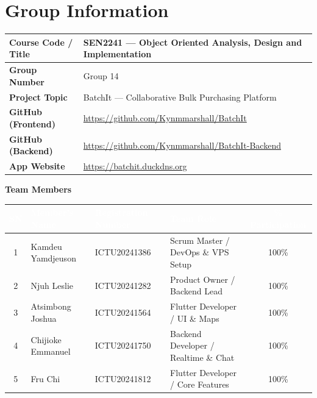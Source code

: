 \documentclass[12pt, a4paper]{report}
\begin{document}
\chapter*{Group Information}

\vspace{0.2cm}
\begin{tabularx}{\textwidth}{lX}
\toprule
\rowcolor{batchitLight}
\textbf{Course Code / Title} & SEN2241 --- Object Oriented Analysis, Design and Implementation\\
\midrule
\textbf{Group Number}        & Group 14 \\
\textbf{Project Topic}       & BatchIt --- Collaborative Bulk Purchasing Platform \\
\textbf{GitHub (Frontend)}   & \url{https://github.com/Kynmmarshall/BatchIt} \\
\textbf{GitHub (Backend)}    & \url{https://github.com/Kynmmarshall/BatchIt-Backend} \\
\textbf{App Website}         & \url{https://batchit.duckdns.org} \\
\bottomrule
\end{tabularx}

\vspace{0.8cm}
{\large\bfseries\color{batchitDark} Team Members}

\vspace{0.4cm}
\begin{tabularx}{\textwidth}{c X X X c}
\toprule
\rowcolor{tablehead}
\textcolor{white}{\textbf{SN}} &
\textcolor{white}{\textbf{Member's Name}} &
\textcolor{white}{\textbf{Registration Number}} &
\textcolor{white}{\textbf{Team Role}} &
\textcolor{white}{\textbf{\% Participation}}\\
\midrule
1 & Kamdeu Yamdjeuson    & ICTU20241386 & Scrum Master / DevOps \& VPS Setup & 100\% \\
\rowcolor{batchitLight}
2 & Njuh Leslie         & ICTU20241282 & Product Owner / Backend Lead    & 100\% \\
3 & Atsimbong Joshua     & ICTU20241564 & Flutter Developer / UI \& Maps & 100\% \\
\rowcolor{batchitLight}
4 & Chijioke Emmanuel    & ICTU20241750 & Backend Developer / Realtime \& Chat & 100\% \\
5 & Fru Chi              & ICTU20241812 & Flutter Developer / Core Features & 100\% \\
\bottomrule
\end{tabularx}
\end{document}
